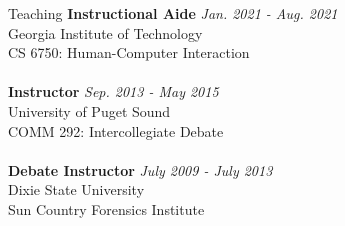 \documentclass{cv} %
\begin{document}
\begin{rSection}{Teaching}
{\bf Instructional Aide} \hfill {\em Jan. 2021 - Aug. 2021}\\
Georgia Institute of Technology\\
CS 6750: Human-Computer Interaction\\
\\
{\bf Instructor} \hfill {\em Sep. 2013 - May 2015}\\
University of Puget Sound\\
COMM 292: Intercollegiate Debate\\
\\
{\bf Debate Instructor} \hfill {\em July 2009 - July 2013}\\
Dixie State University\\
Sun Country Forensics Institute\\
\end{rSection}
\end{document}

